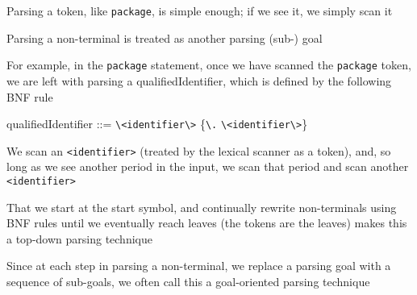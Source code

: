\documentclass[8pt,a4paper,compress]{beamer}
\newenvironment{spaced}
{
\smallskip
\hspace{.5cm}
\begin{minipage}[c]{\textwidth}
}
{
\end{minipage}
\smallskip
}
\begin{document}
\begin{frame}[fragile]
\pause

Parsing a token, like \lstinline{package}, is simple enough; if we see it, we simply scan it

\pause
\bigskip

Parsing a non-terminal is treated as another parsing (sub-) goal

\pause
\bigskip

For example, in the \lstinline{package} statement, once we have scanned the \lstinline{package} token, we are left with parsing a qualifiedIdentifier, which is defined by the following BNF rule

\text{ }
\begin{spaced}
\begin{production}
qualifiedIdentifier ::= \lstinline{\<identifier\>} \{\lstinline{\.} \lstinline{\<identifier\>}\}
\end{production}
\end{spaced}

\pause

We scan an \lstinline{<identifier>} (treated by the lexical scanner as a token), and, so long as we see another period in the input, we scan that period and scan another \lstinline{<identifier>}

\pause
\bigskip

That we start at the start symbol, and continually rewrite non-terminals using BNF rules until we eventually reach leaves (the tokens are the leaves) makes this a top-down parsing technique

\pause
\bigskip

Since at each step in parsing a non-terminal, we replace a parsing goal with a sequence of sub-goals, we often call this a goal-oriented parsing technique
\end{frame}
\end{document}
